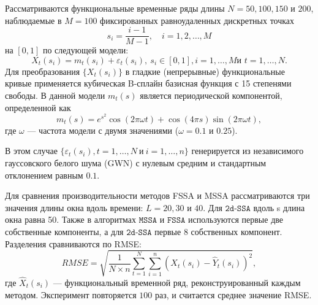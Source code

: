 \documentclass[12pt, specialist, subf
]{disser}
\theoremstyle{definition}
\newcommand{\MSSA}{\texttt{MSSA}}
\newcommand{\FSSA}{\texttt{FSSA}}
\newcommand{\DSSA}{\texttt{2d-SSA}}
\begin{document}
Рассматриваются функциональные временные ряды длины $N=50, 100, 150$ и $200$, наблюдаемые в $M=100$ фиксированных равноудаленных дискретных точках \[
s_i = \frac{i - 1}{M - 1}, \quad i = 1, 2, \dots, M
\] на $[0,1]$ по следующей модели:
\begin{equation}\label{eq:mainmodel}
	X_t\left(s_i\right)=m_t(s_i)+\varepsilon_t\left(s_i\right),\ s_i \in [0,1], i=1,\ldots,M \text{и } t=1, \dots, N.
\end{equation}
Для преобразования $\{X_t(s_i)\}$ в гладкие (непрерывные) функциональные кривые применяется кубическая B-сплайн базисная функция с 15 степенями свободы. В данной модели $m_t(s)$ является периодической компонентой, определенной как
\begin{equation}\label{eq:Trend}
	m_t(s)=e^{s^2} \cos\left(2\pi \omega t\right)+\cos(4\pi s) \sin\left(2\pi \omega t\right),
\end{equation}
где $\omega$ — частота модели с двумя значениями ($\omega=0.1$ и $0.25$).

В этом случае $\{\varepsilon_t(s_i), t=1,\ldots, N\ \text{и}\ i=1,\ldots,n \}$ генерируется из независимого гауссовского белого шума (GWN) с нулевым средним и стандартным отклонением равным $0.1$.

Для сравнения производительности методов FSSA и MSSA рассматриваются три значения длины окна вдоль времени: $L=20, 30$ и $40$. Для $\DSSA$ вдоль s длина окна равна 50. Также в алгоритмах $\MSSA$ и $\FSSA$ используются первые две собственные компоненты, а для $\DSSA$ первые 8 собственных компонент. Разделения сравниваются по RMSE:
\[RMSE= \sqrt {\frac{1}{N\times n}\sum\limits_{t=1}^N \sum_{i=1}^n \left(X_t(s_i)-\hat{Y}_t(s_i)\right)^2},\]
где $\hat{X}_t(s_i)$ — функциональный временной ряд, реконструированный каждым методом. Эксперимент повторяется $100$ раз, и считается среднее значение RMSE.
\end{document}
